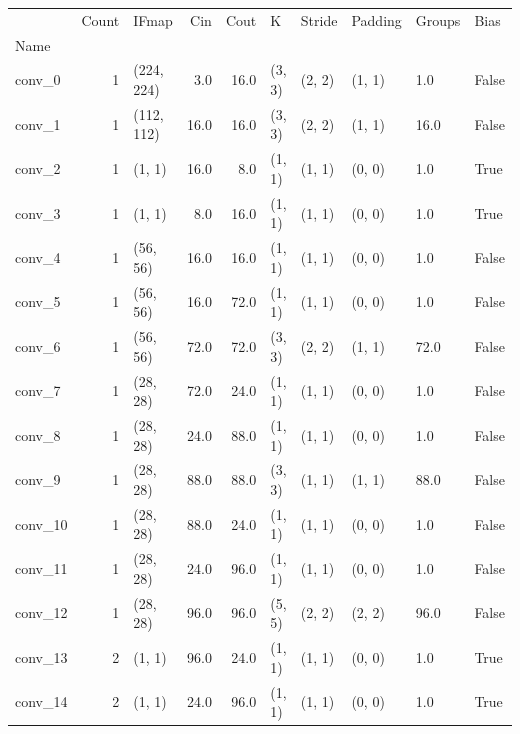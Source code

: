 \clearpage
\begin{center}
    \begin{tabular}{lrlrrlllll}
        \toprule
        {} &  Count &       IFmap &    Cin &    Cout &       K &  Stride & Padding & Groups &   Bias \\
        Name    &        &             &        &         &         &         &         &        &        \\
        \midrule
        conv\_0  &      1 &  (224, 224) &    3.0 &    16.0 &  (3, 3) &  (2, 2) &  (1, 1) &    1.0 &  False \\
        conv\_1  &      1 &  (112, 112) &   16.0 &    16.0 &  (3, 3) &  (2, 2) &  (1, 1) &   16.0 &  False \\
        conv\_2  &      1 &      (1, 1) &   16.0 &     8.0 &  (1, 1) &  (1, 1) &  (0, 0) &    1.0 &   True \\
        conv\_3  &      1 &      (1, 1) &    8.0 &    16.0 &  (1, 1) &  (1, 1) &  (0, 0) &    1.0 &   True \\
        conv\_4  &      1 &    (56, 56) &   16.0 &    16.0 &  (1, 1) &  (1, 1) &  (0, 0) &    1.0 &  False \\
        conv\_5  &      1 &    (56, 56) &   16.0 &    72.0 &  (1, 1) &  (1, 1) &  (0, 0) &    1.0 &  False \\
        conv\_6  &      1 &    (56, 56) &   72.0 &    72.0 &  (3, 3) &  (2, 2) &  (1, 1) &   72.0 &  False \\
        conv\_7  &      1 &    (28, 28) &   72.0 &    24.0 &  (1, 1) &  (1, 1) &  (0, 0) &    1.0 &  False \\
        conv\_8  &      1 &    (28, 28) &   24.0 &    88.0 &  (1, 1) &  (1, 1) &  (0, 0) &    1.0 &  False \\
        conv\_9  &      1 &    (28, 28) &   88.0 &    88.0 &  (3, 3) &  (1, 1) &  (1, 1) &   88.0 &  False \\
        conv\_10 &      1 &    (28, 28) &   88.0 &    24.0 &  (1, 1) &  (1, 1) &  (0, 0) &    1.0 &  False \\
        conv\_11 &      1 &    (28, 28) &   24.0 &    96.0 &  (1, 1) &  (1, 1) &  (0, 0) &    1.0 &  False \\
        conv\_12 &      1 &    (28, 28) &   96.0 &    96.0 &  (5, 5) &  (2, 2) &  (2, 2) &   96.0 &  False \\
        conv\_13 &      2 &      (1, 1) &   96.0 &    24.0 &  (1, 1) &  (1, 1) &  (0, 0) &    1.0 &   True \\
        conv\_14 &      2 &      (1, 1) &   24.0 &    96.0 &  (1, 1) &  (1, 1) &  (0, 0) &    1.0 &   True \\

\end{tabular}
\end{center}
